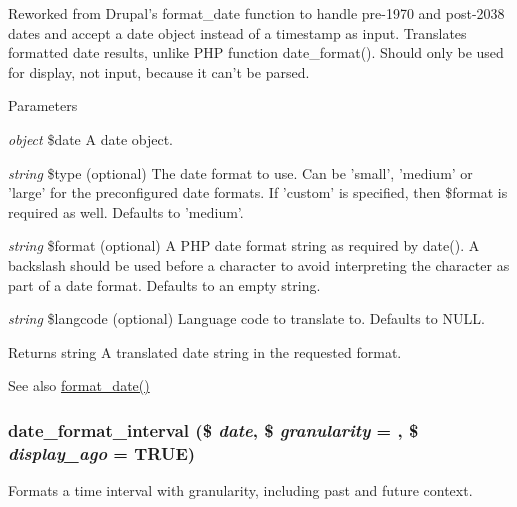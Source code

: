 Reworked from Drupal's format\_\-date function to handle pre-\/1970 and post-\/2038 dates and accept a date object instead of a timestamp as input. Translates formatted date results, unlike PHP function date\_\-format(). Should only be used for display, not input, because it can't be parsed.


\begin{DoxyParams}{Parameters}
\item[{\em object}]\$date A date object. \item[{\em string}]\$type (optional) The date format to use. Can be 'small', 'medium' or 'large' for the preconfigured date formats. If 'custom' is specified, then \$format is required as well. Defaults to 'medium'. \item[{\em string}]\$format (optional) A PHP date format string as required by date(). A backslash should be used before a character to avoid interpreting the character as part of a date format. Defaults to an empty string. \item[{\em string}]\$langcode (optional) Language code to translate to. Defaults to NULL.\end{DoxyParams}
\begin{DoxyReturn}{Returns}
string A translated date string in the requested format.
\end{DoxyReturn}
\begin{DoxySeeAlso}{See also}
\hyperlink{group__format_ga40553742a67f9c79c4669b9053fe202c}{format\_\-date()} 
\end{DoxySeeAlso}
\hypertarget{date__api_8module_a3a94e28f9a43be71c87afdf5e791b9a0}{
\subsubsection[{date\_\-format\_\-interval}]{\setlength{\rightskip}{0pt plus 5cm}date\_\-format\_\-interval (\$ {\em date}, \/  \$ {\em granularity} = {}, \/  \$ {\em display\_\-ago} = {\ttfamily TRUE})}}
\label{date__api_8module_a3a94e28f9a43be71c87afdf5e791b9a0}
Formats a time interval with granularity, including past and future context.


